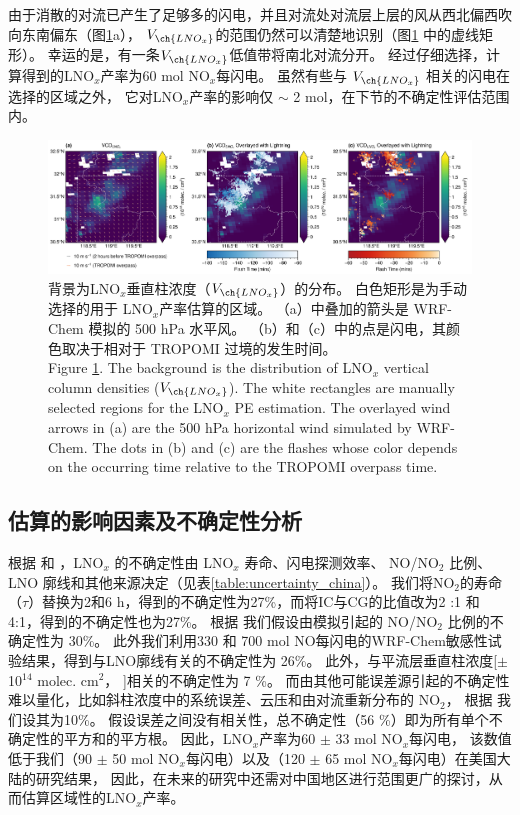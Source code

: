 由于消散的对流已产生了足够多的闪电，并且对流处对流层上层的风从西北偏西吹向东南偏东（图\ref{fig:china_vcd_lnox}a），
$V_{\ch{LNO_x}}$的范围仍然可以清楚地识别（图\ref{fig:china_vcd_lnox} 中的虚线矩形）。
幸运的是，有一条$V_{\ch{LNO_x}}$低值带将南北对流分开。
经过仔细选择，计算得到的LNO$_x$产率为60 mol NO$_x$每闪电。
虽然有些与 $V_{\ch{LNO_x}}$ 相关的闪电在选择的区域之外，
它对LNO$_x$产率的影响仅 $\sim$ 2 mol，在下节的不确定性评估范围内。


\begin{figure}[!htbp]
    \centering
    \includegraphics[width=16cm]{./figures/china_vcd_lnox.png}
    \caption{
    背景为LNO$_x$垂直柱浓度（$V_{\ch{LNO_x}}$）的分布。
     白色矩形是为手动选择的用于 LNO$_x$产率估算的区域。
     （a）中叠加的箭头是 WRF-Chem 模拟的 500 hPa 水平风。
     （b）和（c）中的点是闪电，其颜色取决于相对于 TROPOMI 过境的发生时间。\\
    Figure \ref{fig:china_vcd_lnox}. The background is the distribution of LNO$_x$ vertical column densities ($V_{\ch{LNO_x}}$).
    The white rectangles are manually selected regions for the LNO$_x$ PE estimation.
    The overlayed wind arrows in (a) are the 500 hPa horizontal wind simulated by WRF-Chem.
    The dots in (b) and (c) are the flashes whose color depends on the occurring time relative to the TROPOMI overpass time.
    }
    \label{fig:china_vcd_lnox}
\end{figure}



\subsection{估算的影响因素及不确定性分析} \label{sec:uncertainty_china}

根据 \citet{Allen.2019} 和 \citet{Zhang.2020b}，LNO$_x$ 的不确定性由 LNO$_x$ 寿命、闪电探测效率、
NO/NO$_2$ 比例、LNO 廓线和其他来源决定（见表\ref{table:uncertainty_china}）。
我们将NO$_2$的寿命（$\tau$）替换为2和6 h，得到的不确定性为27\%，而将IC与CG的比值改为2 :1 和 4:1，得到的不确定性也为27\%。
根据 \citet{Allen.2019} 我们假设由模拟引起的 NO/NO$_2$ 比例的不确定性为 30\%。
此外我们利用330 和 700 mol NO每闪电的WRF-Chem敏感性试验结果，得到与LNO廓线有关的不确定性为 26\%。
此外，与平流层垂直柱浓度[$\pm$ 10$^{14}$ molec. cm$^2$， \citet{VanGeffen.2022}]相关的不确定性为 7 \%。
而由其他可能误差源引起的不确定性难以量化，比如斜柱浓度中的系统误差、云压和由对流重新分布的 NO$_2$，
根据 \citet{Allen.2021a}我们设其为10\%。
假设误差之间没有相关性，总不确定性（56 \%）即为所有单个不确定性的平方和的平方根。
因此，LNO$_x$产率为60 $\pm$ 33 mol NO$_x$每闪电，
该数值低于我们（90 $\pm$ 50 mol NO$_x$每闪电）以及\citet{Allen.2021a}（120 $\pm$ 65 mol NO$_x$每闪电）在美国大陆的研究结果，
因此，在未来的研究中还需对中国地区进行范围更广的探讨，从而估算区域性的LNO$_x$产率。


